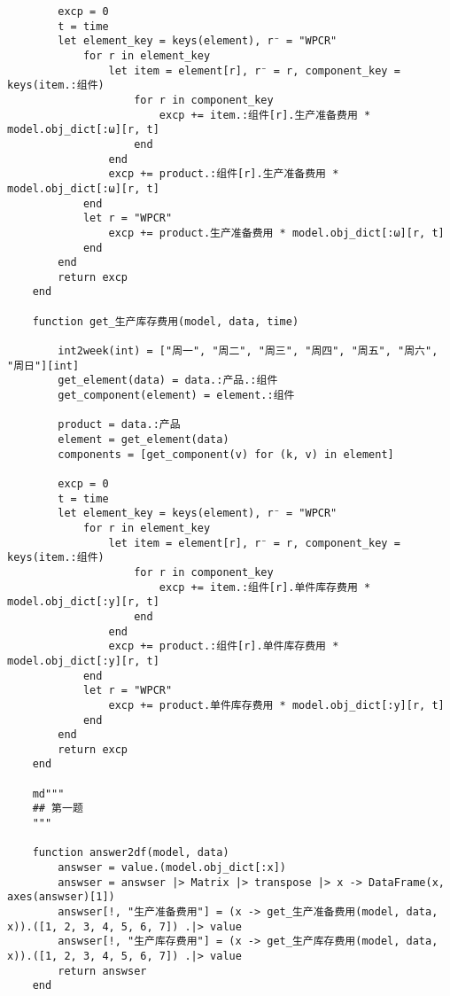 \begin{appendices}
\begin{lstlisting}
        excp = 0
        t = time
        let element_key = keys(element), r⁻ = "WPCR"
            for r in element_key
                let item = element[r], r⁻ = r, component_key = keys(item.:组件)
                    for r in component_key
                        excp += item.:组件[r].生产准备费用 * model.obj_dict[:ω][r, t]
                    end
                end
                excp += product.:组件[r].生产准备费用 * model.obj_dict[:ω][r, t]
            end
            let r = "WPCR"
                excp += product.生产准备费用 * model.obj_dict[:ω][r, t]
            end
        end
        return excp
    end

    function get_生产库存费用(model, data, time)

        int2week(int) = ["周一", "周二", "周三", "周四", "周五", "周六", "周日"][int]
        get_element(data) = data.:产品.:组件
        get_component(element) = element.:组件

        product = data.:产品
        element = get_element(data)
        components = [get_component(v) for (k, v) in element]

        excp = 0
        t = time
        let element_key = keys(element), r⁻ = "WPCR"
            for r in element_key
                let item = element[r], r⁻ = r, component_key = keys(item.:组件)
                    for r in component_key
                        excp += item.:组件[r].单件库存费用 * model.obj_dict[:y][r, t]
                    end
                end
                excp += product.:组件[r].单件库存费用 * model.obj_dict[:y][r, t]
            end
            let r = "WPCR"
                excp += product.单件库存费用 * model.obj_dict[:y][r, t]
            end
        end
        return excp
    end

    md"""
    ## 第一题
    """

    function answer2df(model, data)
        answser = value.(model.obj_dict[:x])
        answser = answser |> Matrix |> transpose |> x -> DataFrame(x, axes(answser)[1])
        answser[!, "生产准备费用"] = (x -> get_生产准备费用(model, data, x)).([1, 2, 3, 4, 5, 6, 7]) .|> value
        answser[!, "生产库存费用"] = (x -> get_生产库存费用(model, data, x)).([1, 2, 3, 4, 5, 6, 7]) .|> value
        return answser
    end


\end{lstlisting}
\end{appendices}
